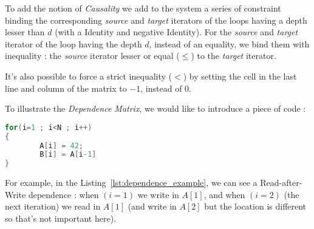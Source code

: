 \documentclass[paper=a4, fontsize=11.5pt]{scrartcl}
\numberwithin{equation}{section}        %
\numberwithin{figure}{section}          %
\numberwithin{table}{section}               %
\begin{document}
\begin{itemize}
                To add the notion of \textit{Causality} we add to the system a series of
                constraint binding the corresponding \textit{source} and \textit{target}
                iterators of the loops having a depth lesser than $d$
                (with a Identity and negative Identity).
                For the \textit{source} and \textit{target} iterator of the loop having
                the depth $d$, instead of an equality, we bind them with inequality :
                the \textit{source} iterator lesser or equal ($\leq$) to the \textit{target} iterator.

                It's also possible to force a strict inequality ($<$) by setting the cell
                in the last line and column of the matrix to $-1$, instead of $0$.
        \end{itemize}

        \medskip
        
        To illustrate the \textit{Dependence Matrix}, we would like to introduce a piece of code :
\begin{lstlisting}[frame=single, language=C, caption={Simple code for Dependence Relation example}, label={lst:dependence_example}]
for(i=1 ; i<N ; i++)
{
        A[i] = 42;
        B[i] = A[i-1]
}
\end{lstlisting}
        
        For example, in the Listing~\ref{lst:dependence_example}, we can see a Read-after-Write
        dependence : when $(i=1)$ we write in $A[1]$, and when $(i=2)$ (the next iteration)
        we read in $A[1]$ (and write in $A[2]$ but the location is different so that's not important here).
\end{document}
